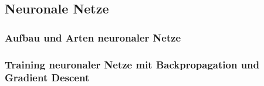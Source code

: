 \subsection{Neuronale Netze}

\subsubsection{Aufbau und Arten neuronaler Netze}

\subsubsection{Training neuronaler Netze mit Backpropagation und Gradient Descent}